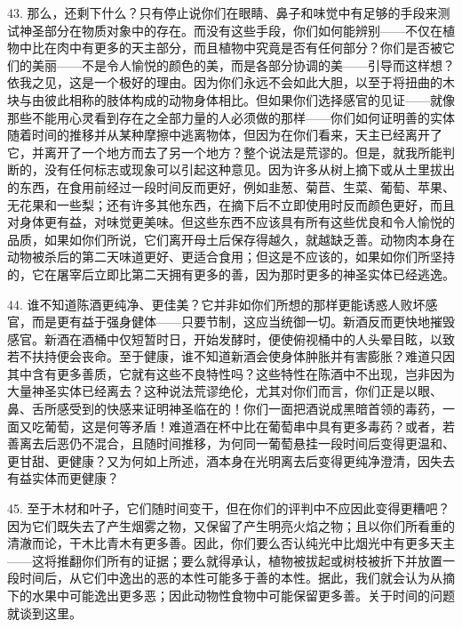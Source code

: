 43. 那么，还剩下什么？只有停止说你们在眼睛、鼻子和味觉中有足够的手段来测试神圣部分在物质对象中的存在。而没有这些手段，你们如何能辨别——不仅在植物中比在肉中有更多的天主部分，而且植物中究竟是否有任何部分？你们是否被它们的美丽——不是令人愉悦的颜色的美，而是各部分协调的美——引导而这样想？依我之见，这是一个极好的理由。因为你们永远不会如此大胆，以至于将扭曲的木块与由彼此相称的肢体构成的动物身体相比。但如果你们选择感官的见证——就像那些不能用心灵看到存在之全部力量的人必须做的那样——你们如何证明善的实体随着时间的推移并从某种摩擦中逃离物体，但因为在你们看来，天主已经离开了它，并离开了一个地方而去了另一个地方？整个说法是荒谬的。但是，就我所能判断的，没有任何标志或现象可以引起这种意见。因为许多从树上摘下或从土里拔出的东西，在食用前经过一段时间反而更好，例如韭葱、菊苣、生菜、葡萄、苹果、无花果和一些梨；还有许多其他东西，在摘下后不立即使用时反而颜色更好，而且对身体更有益，对味觉更美味。但这些东西不应该具有所有这些优良和令人愉悦的品质，如果如你们所说，它们离开母土后保存得越久，就越缺乏善。动物肉本身在动物被杀后的第二天味道更好、更适合食用；但这是不应该的，如果如你们所坚持的，它在屠宰后立即比第二天拥有更多的善，因为那时更多的神圣实体已经逃逸。\par

44. 谁不知道陈酒更纯净、更佳美？它并非如你们所想的那样更能诱惑人败坏感官，而是更有益于强身健体——只要节制，这应当统御一切。新酒反而更快地摧毁感官。新酒在酒桶中仅短暂时日，开始发酵时，便使俯视桶中的人头晕目眩，以致若不扶持便会丧命。至于健康，谁不知道新酒会使身体肿胀并有害膨胀？难道只因其中含有更多善质，它就有这些不良特性吗？这些特性在陈酒中不出现，岂非因为大量神圣实体已经离去？这种说法荒谬绝伦，尤其对你们而言，你们正是以眼、鼻、舌所感受到的快感来证明神圣临在的！你们一面把酒说成黑暗首领的毒药，一面又吃葡萄，这是何等矛盾！难道酒在杯中比在葡萄串中具有更多毒药？或者，若善离去后恶仍不混合，且随时间推移，为何同一葡萄悬挂一段时间后变得更温和、更甘甜、更健康？又为何如上所述，酒本身在光明离去后变得更纯净澄清，因失去有益实体而更健康？\par

45. 至于木材和叶子，它们随时间变干，但在你们的评判中不应因此变得更糟吧？因为它们既失去了产生烟雾之物，又保留了产生明亮火焰之物；且以你们所看重的清澈而论，干木比青木有更多善。因此，你们要么否认纯光中比烟光中有更多天主——这将推翻你们所有的证据；要么就得承认，植物被拔起或树枝被折下并放置一段时间后，从它们中逸出的恶的本性可能多于善的本性。据此，我们就会认为从摘下的水果中可能逸出更多恶；因此动物性食物中可能保留更多善。关于时间的问题就谈到这里。\par

